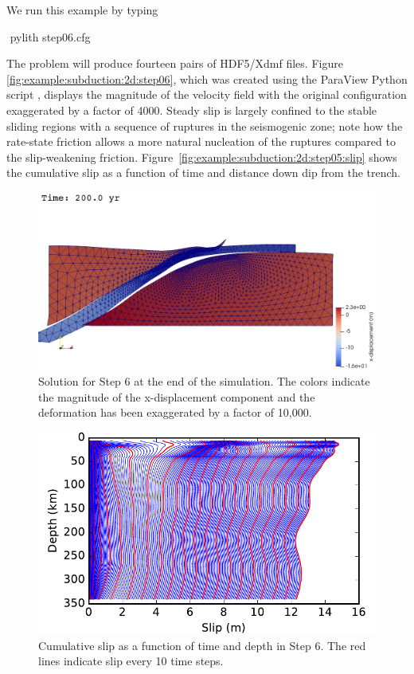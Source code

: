 We run this example by typing
\begin{shell}
$$ pylith step06.cfg
\end{shell}
The problem will produce fourteen pairs of HDF5/Xdmf files. Figure
\vref{fig:example:subduction:2d:step06}, which was created using the
ParaView Python script , displays the
magnitude of the velocity field with the original configuration
exaggerated by a factor of 4000. Steady slip is largely confined to
the stable sliding regions with a sequence of ruptures in the
seismogenic zone; note how the rate-state friction allows a more
natural nucleation of the ruptures compared to the slip-weakening
friction. Figure~\ref{fig:example:subduction:2d:step05:slip} shows the
cumulative slip as a function of time and distance down dip from the
trench.

\begin{figure}
  \includegraphics[width=4.5in]{examples/figs/subduction2d_step06_soln}
  \caption{Solution for Step 6 at the end of the simulation. The
    colors indicate the magnitude of the x-displacement component and
    the deformation has been exaggerated by a factor of 10,000.}
  \label{fig:example:subduction:2d:step06}
\end{figure}

\begin{figure}
  \includegraphics[width=4.5in]{examples/figs/subduction2d_step06_slip}
  \caption{Cumulative slip as a function of time and depth in Step
    6. The red lines indicate slip every 10 time steps.}
  \label{fig:example:subduction:2d:step06:slip}
\end{figure}



